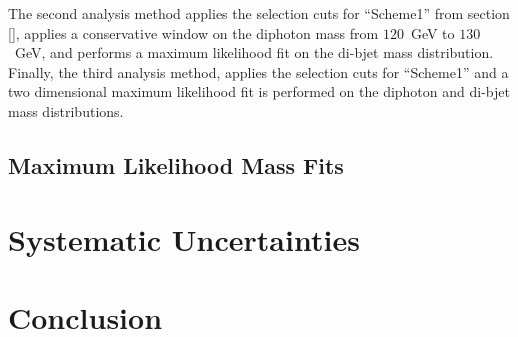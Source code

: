 \documentclass{cmspaper}
\begin{document}
The second analysis method applies the selection cuts for ``Scheme1'' from section \ref{}, applies
a conservative window on the diphoton mass from $120$~GeV to $130$~GeV, and performs a maximum
likelihood fit on the di-bjet mass distribution. Finally, the third analysis method, applies
the selection cuts for ``Scheme1'' and a two dimensional maximum likelihood fit is performed
on the diphoton and di-bjet mass distributions.

\subsection{Maximum Likelihood Mass Fits}
\label{sec:massfits}



\section{Systematic Uncertainties}
\label{sec:systematics}



\section{Conclusion}
\label{sec:conclusion}




%

\appendix
\appendixpage
\end{document}
